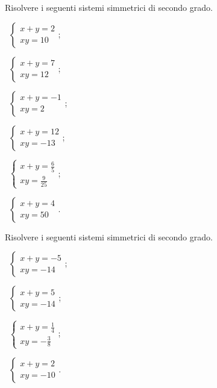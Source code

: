 \begin{esercizio}[\Ast]
 \label{ese:6.16}
Risolvere i seguenti sistemi simmetrici di secondo grado.
\begin{multicols}{3}
 \begin{enumeratea}
 \item~$\left\{\begin{array}{l}x+y=2\\{xy}=10 \end{array}\right.$;
 \item~$\left\{\begin{array}{l}x+y=7\\{xy}=12 \end{array}\right.$;
 \item~$\left\{\begin{array}{l}x+y=-1\\{xy}=2 \end{array}\right.$;
 \item~$\left\{\begin{array}{l}x+y=12\\{xy}=-13 \end{array}\right.$;
 \item~$\left\{\begin{array}{l}x+y=\frac 6 5\\{xy}=\frac 9{25}\end{array}\right.$;
 \item~$\left\{\begin{array}{l}x+y=4\\{xy}=50 \end{array}\right.$.
 \end{enumeratea}
 \end{multicols}
\end{esercizio}

\begin{esercizio}[\Ast]
 \label{ese:6.17}
Risolvere i seguenti sistemi simmetrici di secondo grado.
\begin{multicols}{2}
 \begin{enumeratea}
 \item~$\left\{\begin{array}{l}x+y=-5\\{xy}=-14 \end{array}\right.$;
 \item~$\left\{\begin{array}{l}x+y=5\\{xy}=-14\end{array}\right.$;
 \item~$\left\{\begin{array}{l}x+y=\frac 1 4\\{xy}=-\frac 3 8\end{array}\right.$;
 \item~$\left\{\begin{array}{l}x+y=2\\{xy}=-10\end{array}\right.$.
 \end{enumeratea}
 \end{multicols}
\end{esercizio}


